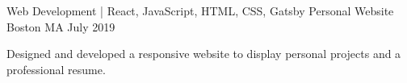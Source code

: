 \begin{cventries}
  \cventry
    {Web Development | React, JavaScript, HTML, CSS, Gatsby} %
    {Personal Website} %
    {Boston MA} %
    {July 2019} %
    {
      \begin{cvitems} %
        \item {Designed and developed a responsive website to display personal projects and a professional resume.}
      \end{cvitems}
    }
    

\end{cventries}
